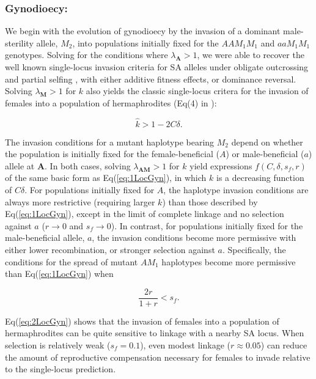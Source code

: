 \documentclass[9pt,twocolumn,twoside,lineno]{gsajnl}
\begin{document}
\subsubsection{Gynodioecy:} We begin with the evolution of gynodioecy by the invasion of a dominant male-sterility allele, $M_2$, into populations initially fixed for the $AAM_1M_1$ and $aaM_1M_1$ genotypes. Solving for the conditions where $\lambda_{\mathbf{A}} > 1$, we were able to recover the well known single-locus invasion criteria for SA alleles under obligate outcrossing \citep{Kidwell1977} and partial selfing \citep{JordanConnallon2014,Olito2017}, with either additive fitness effects, or dominance reversal. Solving $\lambda_{\mathbf{M}} > 1$ for $k$ also yields the classic single-locus critera for the invasion of females into a population of hermaphrodites (Eq(4) in \citealt{Charlesworth1978a}):

\begin{equation}\label{eq:1LocGyn}
	\hat{k} > 1 - 2 C \delta.
\end{equation}

\noindent The invasion conditions for a mutant haplotype bearing $M_2$ depend on whether the population is initially fixed for the female-beneficial ($A$) or male-beneficial ($a$) allele at $\mathbf{A}$. In both cases, solving $\lambda_{\mathbf{AM}} > 1$ for $k$ yield expressions $f(C,\delta,s_f,r)$ of the same basic form as Eq(\ref{eq:1LocGyn}), in which $k$ is a decreasing function of $C \delta$. For populations initially fixed for $A$, the haplotype invasion conditions are always more restrictive (requiring larger $k$) than those described by Eq(\ref{eq:1LocGyn}), except in the limit of complete linkage and no selection against $a$ ($r \rightarrow 0$ and $s_f \rightarrow  0$). In contrast, for populations initially fixed for the male-beneficial allele, $a$, the invasion conditions become more permissive with either lower recombination, or stronger selection against $a$. Specifically, the conditions for the spread of mutant $AM_1$ haplotypes become more permissive than Eq(\ref{eq:1LocGyn}) when 

\begin{equation}\label{eq:2LocGyn}
	\frac{2 r}{1 + r} < s_f.
\end{equation}

\noindent Eq(\ref{eq:2LocGyn}) shows that the invasion of females into a population of hermaphrodites can be quite sensitive to linkage with a nearby SA locus. When selection is relatively weak ($s_f = 0.1$), even modest linkage ($r\approx0.05$) can reduce the amount of reproductive compensation necessary for females to invade relative to the single-locus prediction. 
\end{document}
